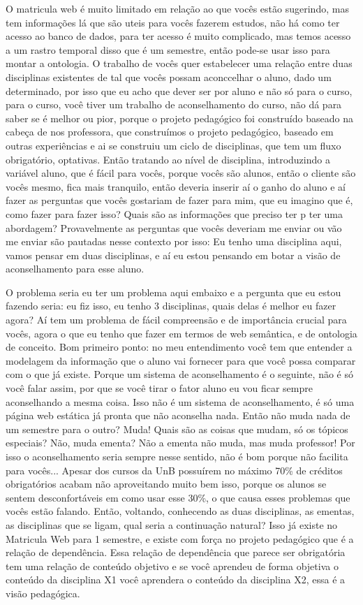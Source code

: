 \begin{enumerate}
		O matricula web é muito limitado em relação ao que vocês estão sugerindo, mas tem informações lá que são uteis para vocês fazerem estudos, não há como ter acesso ao banco de dados, para ter acesso é muito complicado, mas temos acesso a um rastro temporal disso que é um semestre, então pode-se usar isso para montar a ontologia. O trabalho de vocês quer estabelecer uma relação entre duas disciplinas existentes de tal que vocês possam aconccelhar o aluno, dado um determinado, por isso que eu acho que dever ser por aluno e não só para o curso, para o curso, você tiver um trabalho de aconselhamento do curso, não dá para saber se é melhor ou pior, porque o projeto pedagógico foi construído baseado na cabeça de nos professora, que construímos o projeto pedagógico, baseado em outras experiências e ai se construiu um ciclo de disciplinas, que tem um fluxo obrigatório, optativas. Então tratando ao nível de disciplina, introduzindo a variável aluno, que é fácil para vocês, porque vocês são alunos, então o cliente são vocês mesmo, fica mais tranquilo, então deveria inserir aí o ganho do aluno e aí fazer as perguntas que vocês gostariam de fazer para mim, que eu imagino que é, como fazer para fazer isso? Quais são as informações que preciso ter p ter uma abordagem? Provavelmente as perguntas que vocês deveriam me enviar ou vão me enviar são pautadas nesse contexto por isso: Eu tenho uma disciplina aqui, vamos pensar em duas disciplinas, e aí eu estou pensando em botar a visão de aconselhamento para esse aluno.

		O problema seria eu ter um problema aqui embaixo e a pergunta que eu estou fazendo seria: eu fiz isso, eu tenho 3 disciplinas, quais delas é melhor eu fazer agora? Aí tem um problema de fácil compreensão e de importância crucial para vocês, agora o que eu tenho que fazer em termos de web semântica, e de ontologia de conceito. Bom primeiro ponto: no meu entendimento você tem que entender a modelagem da informação que o aluno vai fornecer para que você possa comparar com o que já existe. Porque um sistema de aconselhamento é o seguinte, não é só você falar assim, por que se você tirar o fator aluno eu vou ficar sempre aconselhando a mesma coisa. Isso não é um sistema de aconselhamento, é só uma página web estática já pronta que não aconselha nada. Então não muda nada de um semestre para o outro? Muda! Quais são as coisas que mudam, só os tópicos especiais? Não, muda ementa? Não a ementa não muda, mas muda professor! Por isso o aconselhamento seria sempre nesse sentido, não é bom porque não facilita para vocês... Apesar dos cursos da UnB possuírem no máximo 70\% de créditos obrigatórios acabam não aproveitando muito bem isso, porque os alunos se sentem desconfortáveis em como usar esse 30\%, o que causa esses problemas que vocês estão falando. Então, voltando, conhecendo as duas disciplinas, as ementas, as disciplinas que se ligam, qual seria a continuação natural? Isso já existe no Matricula Web para 1 semestre, e existe com força no projeto pedagógico que é a relação de dependência. Essa relação de dependência que parece ser obrigatória tem uma relação de conteúdo objetivo e se você aprendeu de forma objetiva o conteúdo da disciplina X1 você aprendera o conteúdo da disciplina X2, essa é a visão pedagógica.


\end{enumerate}
